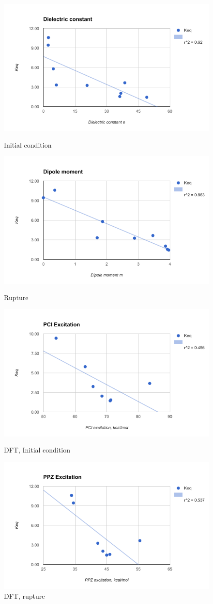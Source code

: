 \documentclass[8.5pt,twoside,twocolumn]{article}
\begin{document}
\begin{figure} \label{ fig7}
  \begin{minipage}[b]{0.49\linewidth}
    \centering
    \includegraphics[width=.5\linewidth]{figures/image}
    \caption{Initial condition} 
  \end{minipage}%
  \begin{minipage}[b]{0.4\linewidth}
    \includegraphics[width=.5\linewidth]{figures/image1}
    \caption{Rupture} 
  \end{minipage}
  \begin{minipage}[b]{0.49\linewidth}
    \includegraphics[width=.5\linewidth]{figures/image2}
    \caption{DFT, Initial condition} 
  \end{minipage}%
  \begin{minipage}[b]{0.49\linewidth}
    \includegraphics[width=.5\linewidth]{figures/image3}
    \caption{DFT, rupture} 
  \end{minipage} 
\end{figure}
\end{document}
